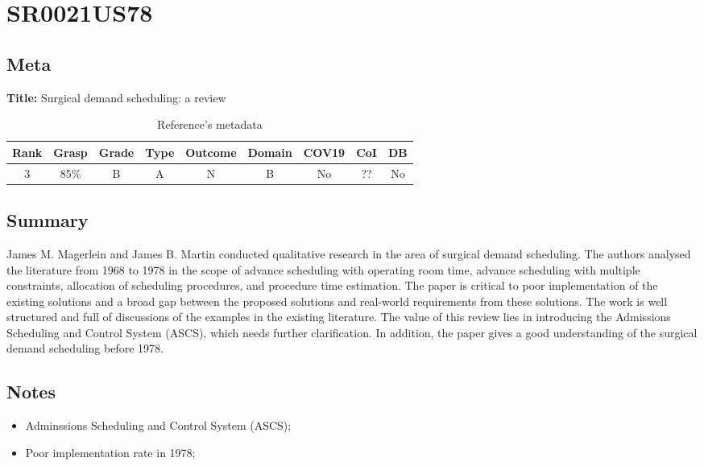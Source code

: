 \section{ SR0021US78 }


\subsection{Meta}

    \textbf{Title:}
    Surgical demand scheduling: a review

    \begin{table}[H]
        \centering
        \begin{tabular}{|c|c|c|c|c|c|c|c|c|}
            \hline
                \textbf{Rank} & \textbf{Grasp} & \textbf{Grade} & \textbf{Type} & \textbf{Outcome} & \textbf{Domain} & \textbf{COV19} & \textbf{CoI} & \textbf{DB} \\
            \hline
                3 & 85\% & B & A & N & B & No & ?? & No \\
            \hline
        \end{tabular}
        \caption{Reference's metadata}
        \label{tab:SR0021US78}
    \end{table}

\subsection{Summary}
    James M. Magerlein and James B. Martin \cite{x235} conducted qualitative research in the area of surgical demand scheduling. The authors analysed the literature from 1968 to 1978 in the scope of advance scheduling with operating room time, advance scheduling with multiple constraints, allocation of scheduling procedures, and procedure time estimation. The paper is critical to poor implementation of the existing solutions and a broad gap between the proposed solutions and real-world requirements from these solutions. The work is well structured and full of discussions of the examples in the existing literature. The value of this review lies in introducing the Admissions Scheduling and Control System (ASCS), which needs further clarification. In addition, the paper gives a good understanding of the surgical demand scheduling before 1978.

\subsection{Notes}
    \begin{itemize}
        \item Adminssions Scheduling and Control System (ASCS);
        \item Poor implementation rate in 1978;
    \end{itemize}


